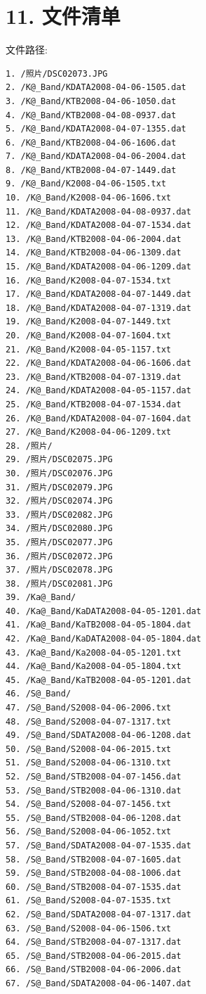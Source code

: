 \documentclass[letterpaper,10pt,english]{sphinxmanual}
\begin{document}
\section{11. 文件清单}
\label{fecd46b0-3390-4580-a415-2d49ba77f9bd:id11}
文件路径: 

\begin{Verbatim}[commandchars=@\[\]]
1. /照片/DSC02073.JPG
2. /K@_Band/KDATA2008-04-06-1505.dat
3. /K@_Band/KTB2008-04-06-1050.dat
4. /K@_Band/KTB2008-04-08-0937.dat
5. /K@_Band/KDATA2008-04-07-1355.dat
6. /K@_Band/KTB2008-04-06-1606.dat
7. /K@_Band/KDATA2008-04-06-2004.dat
8. /K@_Band/KTB2008-04-07-1449.dat
9. /K@_Band/K2008-04-06-1505.txt
10. /K@_Band/K2008-04-06-1606.txt
11. /K@_Band/KDATA2008-04-08-0937.dat
12. /K@_Band/KDATA2008-04-07-1534.dat
13. /K@_Band/KTB2008-04-06-2004.dat
14. /K@_Band/KTB2008-04-06-1309.dat
15. /K@_Band/KDATA2008-04-06-1209.dat
16. /K@_Band/K2008-04-07-1534.txt
17. /K@_Band/KDATA2008-04-07-1449.dat
18. /K@_Band/KDATA2008-04-07-1319.dat
19. /K@_Band/K2008-04-07-1449.txt
20. /K@_Band/K2008-04-07-1604.txt
21. /K@_Band/K2008-04-05-1157.txt
22. /K@_Band/KDATA2008-04-06-1606.dat
23. /K@_Band/KTB2008-04-07-1319.dat
24. /K@_Band/KDATA2008-04-05-1157.dat
25. /K@_Band/KTB2008-04-07-1534.dat
26. /K@_Band/KDATA2008-04-07-1604.dat
27. /K@_Band/K2008-04-06-1209.txt
28. /照片/
29. /照片/DSC02075.JPG
30. /照片/DSC02076.JPG
31. /照片/DSC02079.JPG
32. /照片/DSC02074.JPG
33. /照片/DSC02082.JPG
34. /照片/DSC02080.JPG
35. /照片/DSC02077.JPG
36. /照片/DSC02072.JPG
37. /照片/DSC02078.JPG
38. /照片/DSC02081.JPG
39. /Ka@_Band/
40. /Ka@_Band/KaDATA2008-04-05-1201.dat
41. /Ka@_Band/KaTB2008-04-05-1804.dat
42. /Ka@_Band/KaDATA2008-04-05-1804.dat
43. /Ka@_Band/Ka2008-04-05-1201.txt
44. /Ka@_Band/Ka2008-04-05-1804.txt
45. /Ka@_Band/KaTB2008-04-05-1201.dat
46. /S@_Band/
47. /S@_Band/S2008-04-06-2006.txt
48. /S@_Band/S2008-04-07-1317.txt
49. /S@_Band/SDATA2008-04-06-1208.dat
50. /S@_Band/S2008-04-06-2015.txt
51. /S@_Band/S2008-04-06-1310.txt
52. /S@_Band/STB2008-04-07-1456.dat
53. /S@_Band/STB2008-04-06-1310.dat
54. /S@_Band/S2008-04-07-1456.txt
55. /S@_Band/STB2008-04-06-1208.dat
56. /S@_Band/S2008-04-06-1052.txt
57. /S@_Band/SDATA2008-04-07-1535.dat
58. /S@_Band/STB2008-04-07-1605.dat
59. /S@_Band/STB2008-04-08-1006.dat
60. /S@_Band/STB2008-04-07-1535.dat
61. /S@_Band/S2008-04-07-1535.txt
62. /S@_Band/SDATA2008-04-07-1317.dat
63. /S@_Band/S2008-04-06-1506.txt
64. /S@_Band/STB2008-04-07-1317.dat
65. /S@_Band/STB2008-04-06-2015.dat
66. /S@_Band/STB2008-04-06-2006.dat
67. /S@_Band/SDATA2008-04-06-1407.dat

\end{Verbatim}
\end{document}
